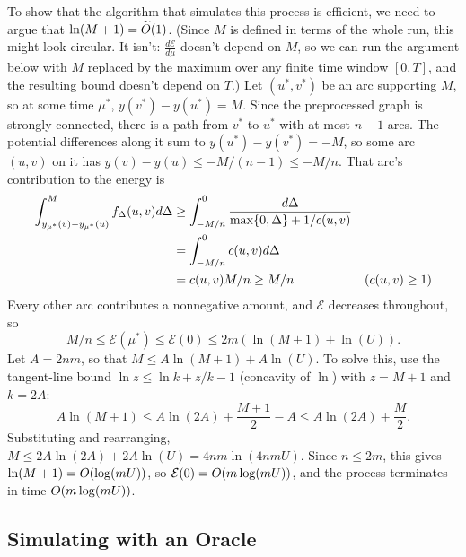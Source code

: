\documentclass[12pt]{article}
\begin{document}
To show that the algorithm that simulates this process is efficient, we need to
argue that $\ln(M + 1) = \apxO{1}$. (Since $M$ is defined in terms of the whole
run, this might look circular. It isn't: $\frac{d\mathcal{E}}{d\mu}$ doesn't
depend on $M$, so we can run the argument below with $M$ replaced by the maximum
over any finite time window $[0, T]$, and the resulting bound doesn't depend on
$T$.) Let $(u^*, v^*)$ be an arc supporting $M$, so at some time $\mu^*$,
$y(v^*) - y(u^*) = M$. Since the preprocessed graph is strongly connected, there
is a path from $v^*$ to $u^*$ with at most $n - 1$ arcs. The potential
differences along it sum to $y(u^*) - y(v^*) = -M$, so some arc $(u, v)$ on it
has $y(v) - y(u) \leq -M/(n - 1) \leq -M/n$. That arc's contribution to the
energy is
\begin{align*}
  \int_{y_{\mu^*}(v)-y_{\mu^*}(u)}^M f_\Delta(u, v) d\Delta & \geq \int_{-M/n}^0 \frac{d\Delta}{\max\Set{0, \Delta} + 1/c(u, v)}                    \\
                                                            & = \int_{-M/n}^0 c(u, v)d\Delta                                                        \\
                                                            & = c(u, v)M/n \geq M/n                                              & (c(u, v) \geq 1)
\end{align*}
Every other arc contributes a nonnegative amount, and $\mathcal{E}$ decreases
throughout, so
\[
  M/n \leq \mathcal{E}(\mu^*) \leq \mathcal{E}(0) \leq 2m(\ln(M + 1) + \ln(U)).
\]
Let $A = 2nm$, so that $M \leq A\ln(M + 1) + A\ln(U)$. To solve this, use the
tangent-line bound $\ln z \leq \ln k + z/k - 1$ (concavity of $\ln$) with
$z = M + 1$ and $k = 2A$:
\[
  A\ln(M + 1) \leq A\ln(2A) + \frac{M + 1}{2} - A \leq A\ln(2A) + \frac{M}{2}.
\]
Substituting and rearranging, $M \leq 2A\ln(2A) + 2A\ln(U) = 4nm\ln(4nmU)$.
Since $n \leq 2m$, this gives $\ln(M + 1) = \bigO{\log(mU)}$, so
$\mathcal{E}(0) = \bigO{m\log(mU)}$, and the process terminates in time
$\bigO{m\log(mU)}$.

\subsection{Simulating with an Oracle}
\label{sec:oracle}
\end{document}
